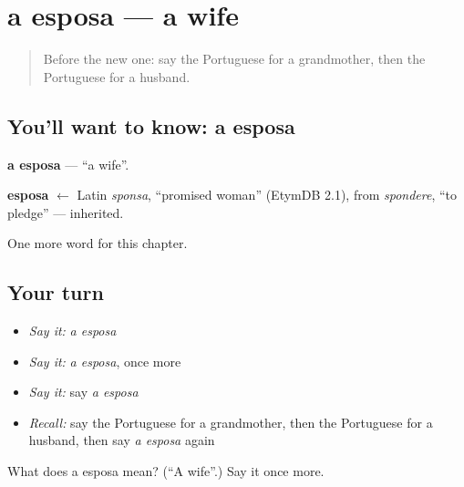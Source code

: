 \section[a esposa]{a esposa — a wife}

\label{lesson:PT-C37-esposa}



\begin{quote}
Before the new one: say the Portuguese for a grandmother, then the Portuguese for a husband.
\end{quote}

\subsection*{You'll want to know: a esposa}
\textbf{a esposa} — \textquotedblleft{}a wife\textquotedblright{}.

\begin{cousinweb}
\textbf{esposa} $\leftarrow$ Latin \emph{sponsa}, \textquotedblleft{}promised woman\textquotedblright{} (EtymDB 2.1), from \emph{spondere}, \textquotedblleft{}to pledge\textquotedblright{} — inherited.
\end{cousinweb}

\begin{grammarlens}[title={What you've built}]
One more word for this chapter.
\end{grammarlens}

\subsection*{Your turn}
\begin{itemize}
\raggedright
  \item \emph{Say it:} \emph{a esposa}
  \item \emph{Say it:} \emph{a esposa}, once more
  \item \emph{Say it:} say \emph{a esposa}
  \item \emph{Recall:} say the Portuguese for a grandmother, then the Portuguese for a husband, then say \emph{a esposa} again
\end{itemize}

\begin{tcolorbox}[breakable,colback=teal!4,colframe=teal!35!black,title={Before you move on}]
What does a esposa mean? (\textquotedblleft{}A wife\textquotedblright{}.) Say it once more.
\end{tcolorbox}
